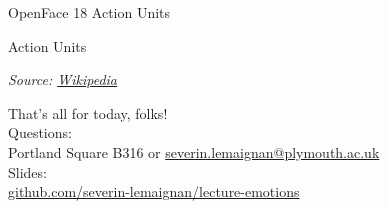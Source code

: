\documentclass[compress]{beamer}
\makeatletter
\def\beamer@writeslidentry@miniframesoff{%
  \expandafter\beamer@ifempty\expandafter{\beamer@framestartpage}{}%
  {%
    \clearpage\beamer@notesactions%
  }
}
\newcommand*{\miniframesoff}{\let\beamer@writeslidentry=\beamer@writeslidentry@miniframesoff}
\newcommand{\source}[2]{{\tiny\it Source: \href{#1}{#2}}}
\makeatother
\begin{document}
\begin{frame}{OpenFace 18 Action Units}
\end{frame}

\begin{frame}{Action Units}



\source{https://en.wikipedia.org/wiki/Facial_Action_Coding_System}{Wikipedia}
\end{frame}



\miniframesoff

\begin{frame}{}
    \begin{center}
        \Large
        That's all for today, folks!\\[2em]
        \normalsize
        Questions:\\
        Portland Square B316 or \url{severin.lemaignan@plymouth.ac.uk} \\[1em]

        Slides:\\
        \href{https://github.com/severin-lemaignan/lecture-emotions}{\small
        github.com/severin-lemaignan/lecture-emotions}

    \end{center}
\end{frame}
\end{document}
